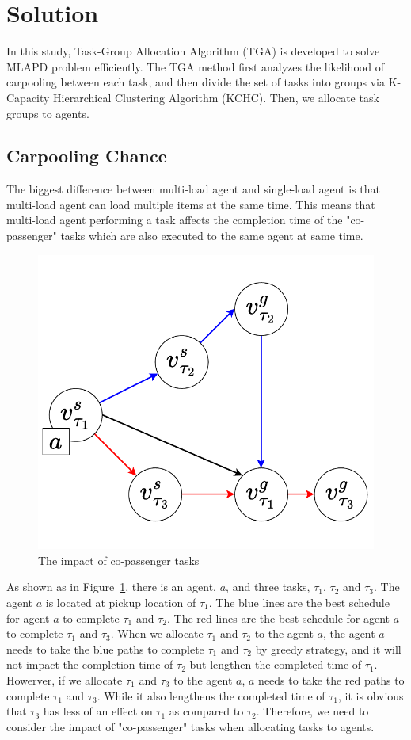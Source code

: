 \documentclass[sigconf,anonymous]{aamas}
\begin{document}
\section{Solution}

In this study, Task-Group Allocation Algorithm (TGA) is developed to solve MLAPD problem efficiently. 
The TGA method first analyzes the likelihood of carpooling between each task, 
and then divide the set of tasks into groups via K-Capacity Hierarchical Clustering Algorithm (KCHC). 
Then, we allocate task groups to agents.

\subsection{Carpooling Chance}
The biggest difference between multi-load agent and single-load agent 
is that multi-load agent can load multiple items at the same time. 
This means that multi-load agent performing a task affects the completion time of the "co-passenger" tasks 
which are also executed to the same agent at same time.
\begin{figure}[ht]
  \centering
  \includegraphics[width=0.5\linewidth]{Fig/carpooling.pdf}
  \caption{The impact of co-passenger tasks}
  \label{fig:carpooling}
\end{figure}

\begin{example}
As shown as in Figure~\ref{fig:carpooling}, there is an agent, $a$, 
and three tasks, $\tau_{1}$, $\tau_{2}$ and $\tau_{3}$.
The agent $a$ is located at pickup location of $\tau_{1}$.
The blue lines are the best schedule for agent $a$ to complete $\tau_{1}$ and $\tau_{2}$.
The red lines are the best schedule for agent $a$ to complete $\tau_{1}$ and $\tau_{3}$.
When we allocate $\tau_{1}$ and $\tau_{2}$ to the agent $a$,
the agent $a$ needs to take the blue paths to complete $\tau_{1}$ and $\tau_{2}$ by greedy strategy,
and it will not impact the completion time of $\tau_{2}$ but lengthen the completed time of $\tau_{1}$.
Howerver, if we allocate $\tau_{1}$ and $\tau_{3}$ to the agent $a$, 
$a$ needs to take the red paths to complete $\tau_{1}$ and $\tau_{3}$.
While it also lengthens the completed time of $\tau_{1}$, 
it is obvious that $\tau_3$ has less of an effect on $\tau_1$ as compared to $\tau_{2}$.
Therefore, we need to consider the impact of "co-passenger" tasks when allocating tasks to agents.
\end{example}
\end{document}
